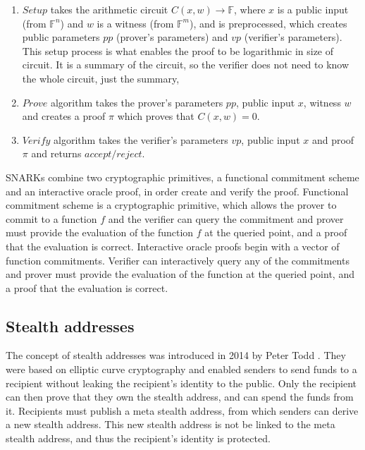 \documentclass[conference,comsoc,10pt]{IEEEtran}
\begin{document}
        \begin{enumerate}
            \item $Setup$ takes
                the arithmetic circuit $C(x, w) \rightarrow \mathbb{F}$, where $x$ is a public
                input (from $\mathbb{F}^n$) and $w$ is a witness (from $\mathbb{F}^m$), and
                is preprocessed, which creates public parameters $pp$ (prover's parameters)
                and $vp$ (verifier's parameters). This setup process is what enables the
                proof to be logarithmic in size of circuit. It is a summary of the circuit,
                so the verifier does not need to know the whole circuit, just the summary,
            \item $Prove$ algorithm takes the prover's parameters $pp$, public input $x$,
                witness $w$ and creates a proof $\pi$ which proves that $C(x, w) = 0$.
            \item $Verify$ algorithm takes the verifier's parameters $vp$, public input $x$ and
                proof $\pi$ and returns $accept/reject$.
        \end{enumerate}

        SNARKs combine two cryptographic primitives, a functional commitment scheme
        and an interactive oracle proof, in order create and verify the proof.
        Functional commitment scheme is a cryptographic primitive, which allows the
        prover to commit to a function $f$ and the verifier can query the commitment and
        prover must provide the evaluation of the function $f$ at the queried point,
        and a proof that the evaluation is correct.
        Interactive oracle proofs begin with a vector of function commitments.
        Verifier can interactively query any of the commitments and prover must
        provide the evaluation of the function at the queried point, and a proof
        that the evaluation is correct\cite{SassonIOPs}.

    \subsection{Stealth addresses}

        The concept of stealth addresses was introduced in 2014 by Peter Todd \cite{ToddStealthAddresses}.
        They were based on elliptic curve cryptography and enabled senders to
        send funds to a recipient without leaking the recipient's identity to
        the public. Only the recipient can then prove that they own the stealth
        address, and can spend the funds from it. Recipients must publish a meta
        stealth address, from which senders can derive a new stealth address.
        This new stealth address is not be linked to the meta stealth address,
        and thus the recipient's identity is protected.
\end{document}
